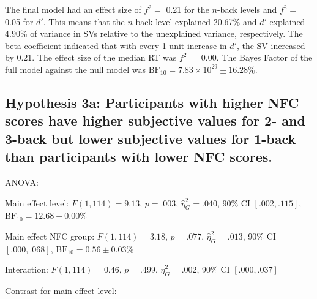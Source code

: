 \documentclass[
  man,floatsintext]{apa6}
\begin{document}
The final model had an effect size of \(f^{2}=\) 0.21 for the \(n\)-back levels and \(f^{2}=\) 0.05 for \(d'\).
This means that the \(n\)-back level explained 20.67\% and \(d'\) explained 4.90\% of variance in SVs relative to the unexplained variance, respectively.
The beta coefficient indicated that with every 1-unit increase in \(d'\), the SV increased by 0.21.
The effect size of the median RT was \(f^{2}=\) 0.00.
The Bayes Factor of the full model against the null model was \(\mathrm{BF}_{\textrm{10}} = 7.83 \times 10^{29} \pm 16.28\%\).

\newpage

\hypertarget{hypothesis-3a-participants-with-higher-nfc-scores-have-higher-subjective-values-for-2--and-3-back-but-lower-subjective-values-for-1-back-than-participants-with-lower-nfc-scores.}{%
\subsection{Hypothesis 3a: Participants with higher NFC scores have higher subjective values for 2- and 3-back but lower subjective values for 1-back than participants with lower NFC scores.}\label{hypothesis-3a-participants-with-higher-nfc-scores-have-higher-subjective-values-for-2--and-3-back-but-lower-subjective-values-for-1-back-than-participants-with-lower-nfc-scores.}}

ANOVA:

Main effect level: \(F(1, 114) = 9.13\), \(p = .003\), \(\hat{\eta}^2_G = .040\), 90\% CI \([.002, .115]\), \(\mathrm{BF}_{\textrm{10}} = 12.68 \pm 0.00\%\)

Main effect NFC group: \(F(1, 114) = 3.18\), \(p = .077\), \(\hat{\eta}^2_G = .013\), 90\% CI \([.000, .068]\), \(\mathrm{BF}_{\textrm{10}} = 0.56 \pm 0.03\%\)

Interaction: \(F(1, 114) = 0.46\), \(p = .499\), \(\hat{\eta}^2_G = .002\), 90\% CI \([.000, .037]\)

Contrast for main effect level:
\end{document}
